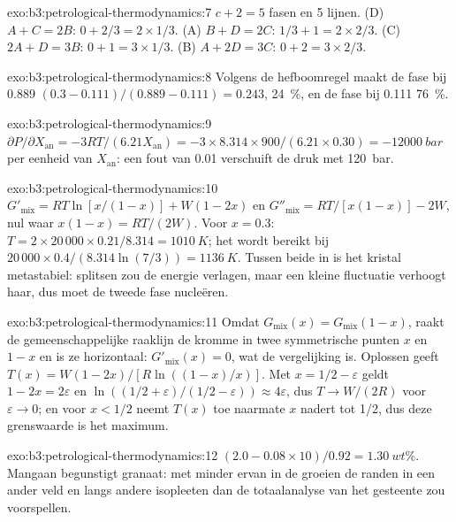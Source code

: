 \begin{solution}{exo:b3:petrological-thermodynamics:7}
$c + 2 = 5$ fasen en 5 lijnen. (D) $A + C = 2B$: $0 + 2/3 = 2\times1/3$. (A)
$B + D = 2C$: $1/3 + 1 = 2\times2/3$. (C) $2A + D = 3B$: $0 + 1 = 3\times1/3$.
(B) $A + 2D = 3C$: $0 + 2 = 3\times2/3$.
\end{solution}

\begin{solution}{exo:b3:petrological-thermodynamics:8}
Volgens de hefboomregel maakt de fase bij 0.889 $(0.3 - 0.111)/(0.889 - 0.111) =
0.243$, \qty{24}{\percent}, en de fase bij 0.111 \qty{76}{\percent}.
\end{solution}

\begin{solution}{exo:b3:petrological-thermodynamics:9}
$\partial P/\partial X_{\text{an}} = -3RT/(6.21X_{\text{an}}) =
-3\times8.314\times900/(6.21\times0.30) = \qty{-12000}{bar}$ per eenheid van
$X_{\text{an}}$: een fout van 0.01 verschuift de druk met \qty{120}{bar}.
\end{solution}

\begin{solution}{exo:b3:petrological-thermodynamics:10}
$G'_{\text{mix}} = RT\ln[x/(1 - x)] + W(1 - 2x)$ en $G''_{\text{mix}} =
RT/[x(1 - x)] - 2W$, nul waar $x(1 - x) = RT/(2W)$. Voor $x = 0.3$: $T =
2\times20\,000\times0.21/8.314 = \qty{1010}{K}$; het  wordt bereikt bij
$20\,000\times0.4/(8.314\ln(7/3)) = \qty{1136}{K}$. Tussen beide in is het
kristal metastabiel: splitsen zou de energie verlagen, maar een kleine
fluctuatie verhoogt haar, dus moet de tweede fase nucleëren.
\end{solution}

\begin{solution}{exo:b3:petrological-thermodynamics:11}
Omdat $G_{\text{mix}}(x) = G_{\text{mix}}(1 - x)$, raakt de gemeenschappelijke
raaklijn de kromme in twee symmetrische punten $x$ en $1 - x$ en is ze horizontaal:
$G'_{\text{mix}}(x) = 0$, wat de vergelijking is. Oplossen geeft $T(x) = W(1 -
2x)/[R\ln((1 - x)/x)]$. Met $x = 1/2 - \varepsilon$ geldt $1 - 2x = 2\varepsilon$
en $\ln((1/2 + \varepsilon)/(1/2 - \varepsilon)) \approx 4\varepsilon$, dus
$T \to W/(2R)$ voor $\varepsilon \to 0$; en voor $x < 1/2$ neemt $T(x)$ toe naarmate $x$
nadert tot 1/2, dus deze grenswaarde is het maximum.
\end{solution}

\begin{solution}{exo:b3:petrological-thermodynamics:12}
$(2.0 - 0.08\times10)/0.92 = \qty{1.30}{wt\percent}$. Mangaan begunstigt
granaat: met minder ervan in de  groeien de randen in
een ander veld en langs andere isopleeten dan de totaalanalyse van het gesteente
zou voorspellen.
\end{solution}

